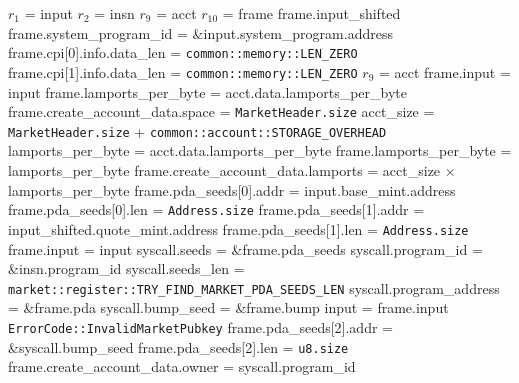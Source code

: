\begin{algorithm}
\caption{INIT-MARKET-PDA}
\begin{algorithmic}
  \INPUT $r_1$ = input
  \INPUT $r_2$ = insn
  \INPUT $r_9$ = acct
  \INPUT $r_{10}$ = frame
  \REQUIRE frame.input\_shifted
  \REQUIRE frame.system\_program\_id = \&input.system\_program.address
  \REQUIRE frame.cpi[0].info.data\_len = \texttt{common::memory::LEN\_ZERO}
  \REQUIRE frame.cpi[1].info.data\_len = \texttt{common::memory::LEN\_ZERO}
  \ENSURE $r_9$ = acct
  \ENSURE frame.input = input
  \ENSURE frame.lamports\_per\_byte = acct.data.lamports\_per\_byte
  \STATE frame.create\_account\_data.space = \texttt{MarketHeader.size}
  \STATE acct\_size = \texttt{MarketHeader.size} + \texttt{common::account::STORAGE\_OVERHEAD}
  \STATE lamports\_per\_byte = acct.data.lamports\_per\_byte
  \STATE frame.lamports\_per\_byte = lamports\_per\_byte
  \STATE frame.create\_account\_data.lamports = acct\_size $\times$ lamports\_per\_byte
  \STATE frame.pda\_seeds[0].addr = input.base\_mint.address
  \STATE frame.pda\_seeds[0].len = \texttt{Address.size}
  \STATE frame.pda\_seeds[1].addr = input\_shifted.quote\_mint.address
  \STATE frame.pda\_seeds[1].len = \texttt{Address.size}
  \STATE frame.input = input
  \STATE syscall.seeds = \&frame.pda\_seeds
  \STATE syscall.program\_id = \&insn.program\_id
  \STATE syscall.seeds\_len = \texttt{market::register::TRY\_FIND\_MARKET\_PDA\_SEEDS\_LEN}
  \STATE syscall.program\_address = \&frame.pda
  \STATE syscall.bump\_seed = \&frame.bump
  \STATE {}
  \STATE input = frame.input
    \RETURN \texttt{ErrorCode::InvalidMarketPubkey}
  \ENDIF
  \STATE frame.pda\_seeds[2].addr = \&syscall.bump\_seed
  \STATE frame.pda\_seeds[2].len = \texttt{u8.size}
  \STATE frame.create\_account\_data.owner = syscall.program\_id
  \STATE {}
\ENDPROCEDURE
\end{algorithmic}
\end{algorithm}
